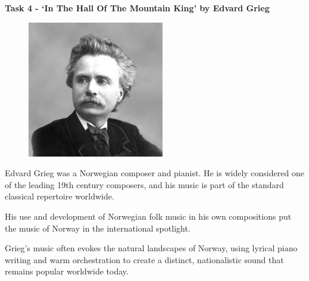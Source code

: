 \documentclass{article}
\begin{document}
\begin{center}
    \fontsize{18}{22}\selectfont
    \textbf{Task 4 - ‘In The Hall Of The Mountain King' by Edvard Grieg}
\end{center}
\setlength{\columnsep}{1.5em}
\begin{figure}
    \vspace{-0.8em}
    \centering
    \includegraphics[width=\linewidth]{t4pic.jpg} %
\end{figure}
\vspace{1em}



\noindent Edvard Grieg was a Norwegian composer and pianist. He is widely considered one of the leading 19th century composers, and his music is part of the standard classical repertoire worldwide. 
\par \noindent His use and development of Norwegian folk music in his own compositions put the music of Norway in the international spotlight.

\par \noindent Grieg's music often evokes the natural landscapes of Norway, using lyrical piano writing and warm orchestration to create a distinct, nationalistic sound that remains popular worldwide today.
\end{document}
